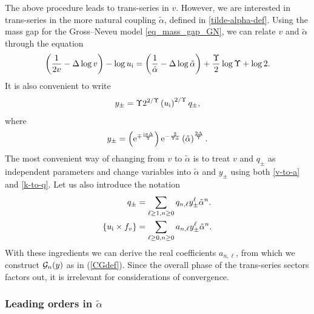 \documentclass[a4paper,11pt]{article}
\theoremstyle{definition}
\newcommand{\CG}{{\cal G}}
\newcommand{\re}{{\rm e}}
\newcommand{\ri}{{\rm i}}
\newcommand{\be}{\begin{equation}}
\newcommand{\ee}{\end{equation}}
\newcommand{\ba}{\begin{aligned}}
\newcommand{\ea}{\end{aligned}}
\begin{document}
The above procedure leads to trans-series in $v$. However, we are interested in trans-series in the more natural coupling $\tilde{\alpha}$, defined in \eqref{tilde-alpha-def}.
Using the mass gap for the Gross--Neveu model \eqref{eq_mass_gap_GN}, we can relate $v$ and $\tilde{\alpha}$ through the equation
\begin{equation}
\left(\frac{1}{2v}-\Delta\log v\right) - \log u_\ri = \left(\frac{1}{\tilde{\alpha}}-\Delta\log\tilde{\alpha}\right)+\frac{\Upsilon}{2}\log\Upsilon +\log 2.
\label{v-to-a}
\end{equation}
It is also convenient to write
\begin{equation}
y_\pm = \Upsilon  2^{2/\Upsilon } \left(u_\ri\right)^{2/\Upsilon}q_\pm,
\label{k-to-q}
\end{equation}
where
\begin{equation}
y_\pm = \left(\re^{\mp\frac{\ri\pi\Delta}{\Upsilon}}\right)\re^{- \frac{2}{\Upsilon \tilde{\alpha}}}\left(\tilde\alpha\right)^{\frac{2\Delta}{\Upsilon}}.
\end{equation}
The most convenient way of changing from $v$ to $\tilde{\alpha}$ is to treat $v$ and $q_\pm$ as independent parameters and change variables into $\tilde{\alpha}$ and $y_\pm$ using both \eqref{v-to-a} and \eqref{k-to-q}. Let us also introduce the notation
%
\begin{equation}
\ba
q_\pm &= \sum_{\ell\geq 1, n\geq 0} q_{n,\ell} y^\ell_\pm \tilde\alpha^n.\\
\left\{u_\ri\times f_v\right\} &= \sum_{\ell\geq 0, n\geq 0} a_{n, \ell} y^\ell_\pm \tilde\alpha^n.\\
\ea
\end{equation}
%
With these ingredients we can derive the real coefficients $a_{n, \ell}$, from which we construct $\CG_n(y)$ as in (\ref{CGdef}). 
Since the overall phase of the trans-series sectors factors out, it is irrelevant for considerations of convergence.

\subsubsection{Leading orders in \texorpdfstring{$\tilde{\alpha}$}{alpha}}
\end{document}
